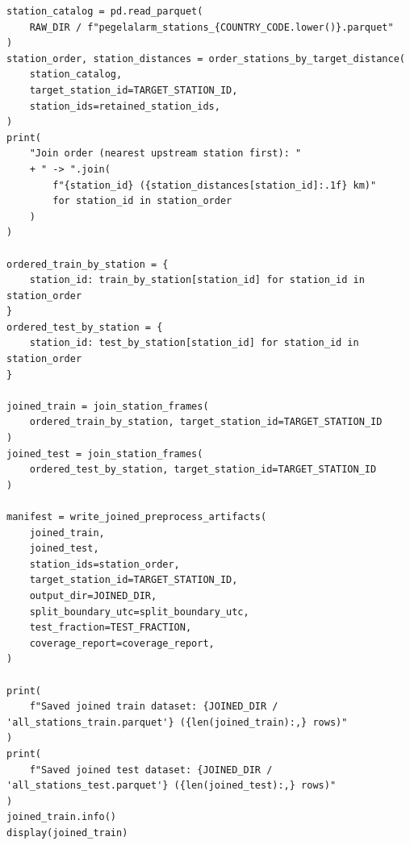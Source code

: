 \begin{verbatim}
station_catalog = pd.read_parquet(
    RAW_DIR / f"pegelalarm_stations_{COUNTRY_CODE.lower()}.parquet"
)
station_order, station_distances = order_stations_by_target_distance(
    station_catalog,
    target_station_id=TARGET_STATION_ID,
    station_ids=retained_station_ids,
)
print(
    "Join order (nearest upstream station first): "
    + " -> ".join(
        f"{station_id} ({station_distances[station_id]:.1f} km)"
        for station_id in station_order
    )
)

ordered_train_by_station = {
    station_id: train_by_station[station_id] for station_id in station_order
}
ordered_test_by_station = {
    station_id: test_by_station[station_id] for station_id in station_order
}

joined_train = join_station_frames(
    ordered_train_by_station, target_station_id=TARGET_STATION_ID
)
joined_test = join_station_frames(
    ordered_test_by_station, target_station_id=TARGET_STATION_ID
)

manifest = write_joined_preprocess_artifacts(
    joined_train,
    joined_test,
    station_ids=station_order,
    target_station_id=TARGET_STATION_ID,
    output_dir=JOINED_DIR,
    split_boundary_utc=split_boundary_utc,
    test_fraction=TEST_FRACTION,
    coverage_report=coverage_report,
)

print(
    f"Saved joined train dataset: {JOINED_DIR / 'all_stations_train.parquet'} ({len(joined_train):,} rows)"
)
print(
    f"Saved joined test dataset: {JOINED_DIR / 'all_stations_test.parquet'} ({len(joined_test):,} rows)"
)
joined_train.info()
display(joined_train)
\end{verbatim}
